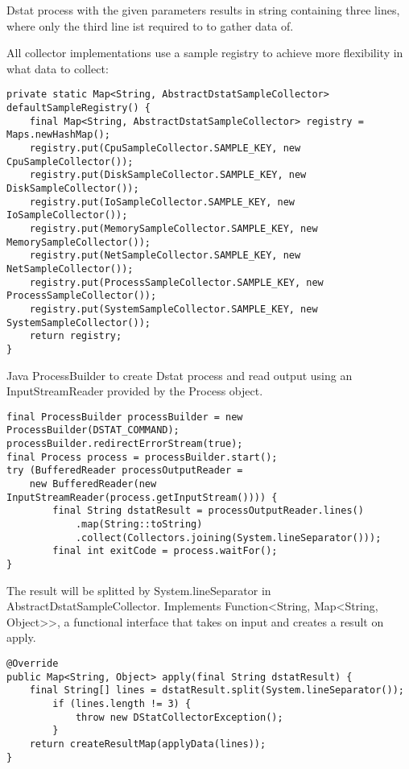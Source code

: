 Dstat process with the given parameters results in string containing three lines, where only the third line ist required to
to gather data of.

All collector implementations use a sample registry to achieve more flexibility in what data to collect:
\begin{lstlisting}[caption={Sample registry in "DstatCollector"}, captionpos=b, label={lst:dstatsampleregistry}]
private static Map<String, AbstractDstatSampleCollector> defaultSampleRegistry() {
    final Map<String, AbstractDstatSampleCollector> registry = Maps.newHashMap();
    registry.put(CpuSampleCollector.SAMPLE_KEY, new CpuSampleCollector());
    registry.put(DiskSampleCollector.SAMPLE_KEY, new DiskSampleCollector());
    registry.put(IoSampleCollector.SAMPLE_KEY, new IoSampleCollector());
    registry.put(MemorySampleCollector.SAMPLE_KEY, new MemorySampleCollector());
    registry.put(NetSampleCollector.SAMPLE_KEY, new NetSampleCollector());
    registry.put(ProcessSampleCollector.SAMPLE_KEY, new ProcessSampleCollector());
    registry.put(SystemSampleCollector.SAMPLE_KEY, new SystemSampleCollector());
    return registry;
}
\end{lstlisting}

Java ProcessBuilder to create Dstat process and read output using an InputStreamReader provided by the Process object.
\begin{lstlisting}[caption={ProcessBuilder in "DstatCollector"}, captionpos=b, label={lst:dstatprocessbuilder}]
final ProcessBuilder processBuilder = new ProcessBuilder(DSTAT_COMMAND);
processBuilder.redirectErrorStream(true);
final Process process = processBuilder.start();
try (BufferedReader processOutputReader =
    new BufferedReader(new InputStreamReader(process.getInputStream()))) {
        final String dstatResult = processOutputReader.lines()
            .map(String::toString)
            .collect(Collectors.joining(System.lineSeparator()));
        final int exitCode = process.waitFor();
}
\end{lstlisting}

The result will be splitted by System.lineSeparator in AbstractDstatSampleCollector. Implements Function<String, Map<String, Object>>,
a functional interface that takes on input and creates a result on apply.
\begin{lstlisting}[caption={Split Dstat input in "AbstractDstatSampleCollector"}, captionpos=b, label={lst:dstatsplitdat}]
@Override
public Map<String, Object> apply(final String dstatResult) {
    final String[] lines = dstatResult.split(System.lineSeparator());
        if (lines.length != 3) {
            throw new DStatCollectorException();
        }
    return createResultMap(applyData(lines));
}
\end{lstlisting}

